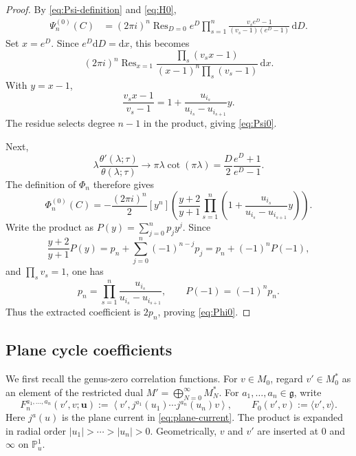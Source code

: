 \documentclass[11pt,a4paper]{amsart}
\numberwithin{equation}{section}
\theoremstyle{definition}
\theoremstyle{remark}
\DeclareMathOperator*{\Res}{Res}
\newcommand{\g}{\mathfrak g}
\newcommand{\ii}{i}
\newcommand{\e}{e}
\newcommand{\dd}{\mathrm d}
\newcommand{\ubf}{\boldsymbol u}
\begin{document}
\begin{proof}
By \eqref{eq:Psi-definition} and \eqref{eq:H0},
\begin{align*}
 \Psi_n^{(0)}(C)
 &=(2\pi\ii)^n\Res_{D=0}
 \e^D\prod_{s=1}^n
 \frac{v_s\e^D-1}{(v_s-1)(\e^D-1)}\,\dd D.
\end{align*}
Set $x=\e^D$.  Since $\e^D\dd D=\dd x$, this becomes
\begin{equation*}
 (2\pi\ii)^n\Res_{x=1}
 \frac{\prod_s(v_sx-1)}
 {(x-1)^n\prod_s(v_s-1)}\,\dd x.
\end{equation*}
With $y=x-1$,
\begin{equation*}
 \frac{v_sx-1}{v_s-1}
 =1+\frac{u_{i_s}}{u_{i_s}-u_{i_{s+1}}}y.
\end{equation*}
The residue selects degree $n-1$ in the product, giving
\eqref{eq:Psi0}.

Next,
\begin{equation*}
 \lambda\frac{\theta'(\lambda;\tau)}{\theta(\lambda;\tau)}
 \longrightarrow
 \pi\lambda\cot(\pi\lambda)
 =\frac D2\frac{\e^D+1}{\e^D-1}.
\end{equation*}
The definition of $\Phi_n$ therefore gives
\begin{equation*}
 \Phi_n^{(0)}(C)
 =-\frac{(2\pi\ii)^n}{2}
 [y^n]\left(
 \frac{y+2}{y+1}
 \prod_{s=1}^n
 \left(1+\frac{u_{i_s}}{u_{i_s}-u_{i_{s+1}}}y\right)\right).
\end{equation*}
Write the product as $P(y)=\sum_{j=0}^np_jy^j$.  Since
\begin{equation*}
 [y^n]\frac{y+2}{y+1}P(y)
 =p_n+\sum_{j=0}^n(-1)^{n-j}p_j
 =p_n+(-1)^nP(-1),
\end{equation*}
and $\prod_sv_s=1$, one has
\begin{equation*}
 p_n=\prod_{s=1}^n\frac{u_{i_s}}{u_{i_s}-u_{i_{s+1}}},
 \qquad P(-1)=(-1)^np_n.
\end{equation*}
Thus the extracted coefficient is $2p_n$, proving \eqref{eq:Phi0}.
\end{proof}

\subsection{Plane cycle coefficients}

We first recall the genus-zero correlation functions.  For $v\in M_0$, regard $v'\in M_0^*$ as an element of the restricted dual $M'=\bigoplus_{N=0}^{\infty} M^{*}_N$. For $a_1,\ldots,a_n\in\g$, write
\begin{equation}
 F^{a_1,\ldots,a_n}_n(v',v;\ubf)
 :=\left\langle v',
 j^{a_1}(u_1)\cdots j^{a_n}(u_n)v\right\rangle,
 \qquad F_0(v',v):=\langle v',v\rangle.
 \label{eq:plane-matrix-coefficient}
\end{equation}
Here $j^a(u)$ is the plane current in \eqref{eq:plane-current}.
The product is expanded in radial order $|u_1|>\cdots>|u_n|>0$.
Geometrically, $v$ and $v'$ are inserted at $0$ and $\infty$ on
$\mathbb P^1_u$.
\end{document}
